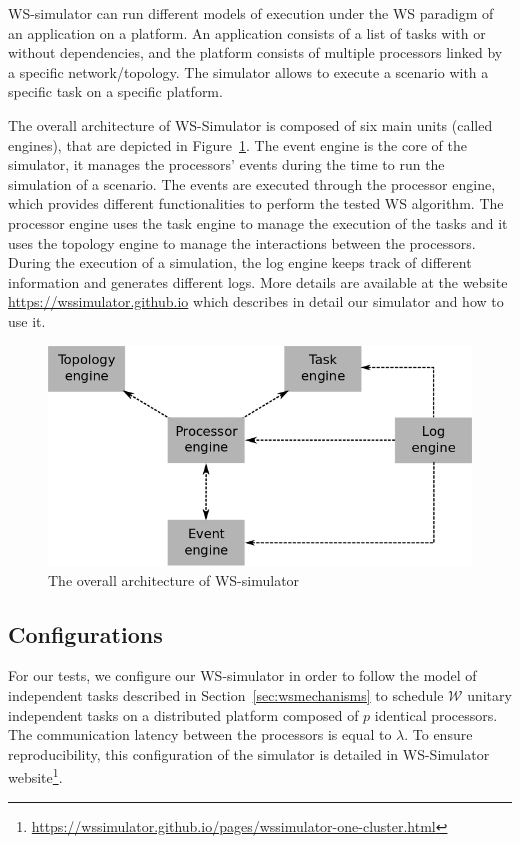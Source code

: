 WS-simulator can run different models of execution under the WS paradigm of an application on a platform. An application
consists of a list of tasks with or without dependencies, and the
platform consists of multiple processors linked by a specific
network/topology.  The simulator allows to execute a scenario with a specific
task on a specific platform. 

The overall architecture of WS-Simulator is composed of six main units (called engines),
that are depicted in Figure~\ref{fig:archsimu}. The event engine is the core of the simulator,
it manages the processors' events during the time to run the simulation of a scenario.
The events are executed through the processor engine, which provides different
functionalities to perform the tested WS algorithm.
The processor engine uses the task engine to manage the execution of the tasks
and it uses the topology engine to manage the interactions between the processors.
During the execution of a simulation, the log engine keeps track of different
information and generates different logs.
More details are available at the website \url{https://wssimulator.github.io}
which describes in detail our simulator and how to use it.

\begin{figure}[h]
  \centering
    \includegraphics[width=0.7\linewidth]{figures/simulatorArchitecture.png} 
  \caption{The overall architecture of WS-simulator}
    \label{fig:archsimu}
\end{figure}


\subsection{Configurations}

For our tests, we configure our WS-simulator in order to follow the model
of independent tasks described in Section~\ref{sec:wsmechanisms} to
schedule $\mathcal{W}$ unitary independent tasks on a distributed
platform composed of $p$ identical processors. The communication
latency between the processors is equal to $\lambda$.  
To ensure reproducibility, this configuration of the simulator is detailed
in WS-Simulator website\footnote{\url{https://wssimulator.github.io/pages/wssimulator-one-cluster.html}}.

